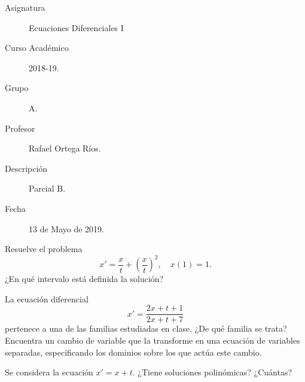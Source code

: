 \documentclass[12pt]{article}
\begin{document}

    
    

    \begin{description}
        \item[Asignatura] Ecuaciones Diferenciales I
        \item[Curso Académico] 2018-19.
        \item[Grupo] A.
        \item[Profesor] Rafael Ortega Ríos.
        \item[Descripción] Parcial B.
        \item[Fecha] 13 de Mayo de 2019.
    \end{description}
    \newpage

    \begin{ejercicio}
        Resuelve el problema
        \begin{equation*}
            x' = \dfrac{x}{t} + \left(\dfrac{x}{t}\right)^2, \quad x(1) = 1.
        \end{equation*}
        ¿En qué intervalo está definida la solución?
    \end{ejercicio}

    \begin{ejercicio}
        La ecuación diferencial
        \begin{equation*}
            x' = \dfrac{2x + t + 1}{2x + t + 7}
        \end{equation*}
        pertenece a una de las familias estudiadas en clase. ¿De qué familia se trata?
        Encuentra un cambio de variable que la transforme en una ecuación de variables separadas, especificando los dominios sobre los que actúa este cambio.
    \end{ejercicio}

    \begin{ejercicio}
        Se considera la ecuación $x' = x+t$. ¿Tiene soluciones polinómicas? ¿Cuántas?
    \end{ejercicio}
\end{document}
